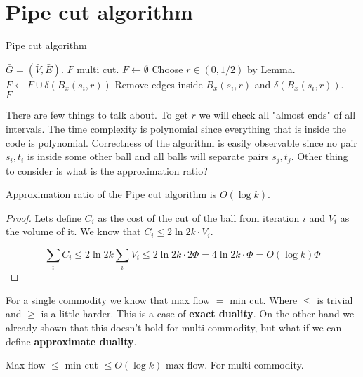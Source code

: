 \section{Pipe cut algorithm}

\begin{algorithm}[!h]
	\caption{Pipe cut algorithm}
	\begin{algorithmic}[1]
		\Require $\bar{G} = (\bar{V}, \bar{E})$.
		\Ensure $F$ multi cut.
		\State $F \gets \emptyset$
				\State Choose $r \in (0, 1/2)$ by Lemma.
				\State $F \gets F \cup \delta(B_{x}(s_{i}, r))$
				\State Remove edges inside $B_{x}(s_{i}, r)$ and $\delta(B_{x}(s_{i}, r))$.
			\EndIf
		\EndFor \\
		\Return $F$
	\end{algorithmic}
\end{algorithm}



There are few things to talk about. To get $r$ we will check all "almost ends" of all intervals. The time complexity is polynomial since everything that is inside the code is polynomial. Correctness of the algorithm is easily observable since no pair $s_{i},t_{i}$ is inside some other ball and all balls will separate pairs $s_{j}, t_{j}$. Other thing to consider is what is the approximation ratio?

\begin{thm}
	Approximation ratio of the Pipe cut algorithm is $O(\log k)$.
\end{thm}

\begin{proof}
	Lets define $C_{i}$ as the cost of the cut of the ball from iteration $i$ and $V_{i}$ as the volume of it. We know that $C_{i} \leq 2 \ln 2k \cdot V_{i}$.
	
	$$
	\sum_{i} C_{i} \leq 2 \ln 2k \sum_{i}V_{i} \leq 2 \ln 2k \cdot 2 \Phi = 4 \ln 2k \cdot \Phi = O (\log k) \Phi
	$$
\end{proof}

For a single commodity we know that max flow $=$ min cut. Where $\leq$ is trivial and $\geq$ is a little harder. This is a case of \textbf{exact duality}. On the other hand we already shown that this doesn't hold for multi-commodity, but what if we can define \textbf{approximate duality}.

\begin{cor}
	Max flow $\leq$ min cut $\leq O(\log k)$ max flow. For multi-commodity.
\end{cor}

